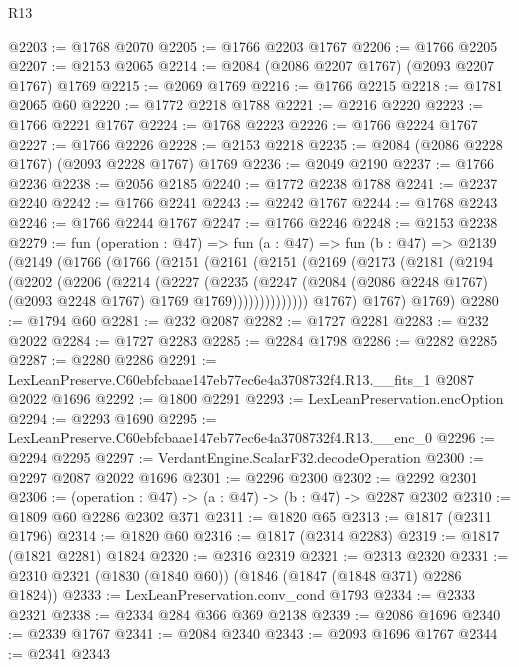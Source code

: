 \begin{lexlean}{R13}
\begin{coremodule}
@2203 := @1768 @2070
@2205 := @1766 @2203 @1767
@2206 := @1766 @2205
@2207 := @2153 @2065
@2214 := @2084 (@2086 @2207 @1767) (@2093 @2207 @1767) @1769
@2215 := @2069 @1769
@2216 := @1766 @2215
@2218 := @1781 @2065 @60
@2220 := @1772 @2218 @1788
@2221 := @2216 @2220
@2223 := @1766 @2221 @1767
@2224 := @1768 @2223
@2226 := @1766 @2224 @1767
@2227 := @1766 @2226
@2228 := @2153 @2218
@2235 := @2084 (@2086 @2228 @1767) (@2093 @2228 @1767) @1769
@2236 := @2049 @2190
@2237 := @1766 @2236
@2238 := @2056 @2185
@2240 := @1772 @2238 @1788
@2241 := @2237 @2240
@2242 := @1766 @2241
@2243 := @2242 @1767
@2244 := @1768 @2243
@2246 := @1766 @2244 @1767
@2247 := @1766 @2246
@2248 := @2153 @2238
@2279 := fun (operation : @47) =>
  fun (a : @47) =>
  fun (b : @47) =>
  @2139
    (@2149
      (@1766
        (@1766
          (@2151
            (@2161
              (@2151
                (@2169
                  (@2173
                    (@2181
                      (@2194
                        (@2202
                          (@2206
                            (@2214
                              (@2227
                                (@2235
                                  (@2247
                                    (@2084
                                      (@2086 @2248 @1767)
                                      (@2093 @2248 @1767)
                                      @1769
                                      @1769))))))))))))))
          @1767)
        @1767)
      @1769)
@2280 := @1794 @60
@2281 := @232 @2087
@2282 := @1727 @2281
@2283 := @232 @2022
@2284 := @1727 @2283
@2285 := @2284 @1798
@2286 := @2282 @2285
@2287 := @2280 @2286
@2291 := LexLeanPreserve.C60ebfcbaae147eb77ec6e4a3708732f4.R13.__fits_1 @2087 @2022 @1696
@2292 := @1800 @2291
@2293 := LexLeanPreservation.encOption
@2294 := @2293 @1690
@2295 := LexLeanPreserve.C60ebfcbaae147eb77ec6e4a3708732f4.R13.__enc_0
@2296 := @2294 @2295
@2297 := VerdantEngine.ScalarF32.decodeOperation
@2300 := @2297 @2087 @2022 @1696
@2301 := @2296 @2300
@2302 := @2292 @2301
@2306 := (operation : @47) -> (a : @47) -> (b : @47) -> @2287 @2302
@2310 := @1809 @60 @2286 @2302 @371
@2311 := @1820 @65
@2313 := @1817 (@2311 @1796)
@2314 := @1820 @60
@2316 := @1817 (@2314 @2283)
@2319 := @1817 (@1821 @2281) @1824
@2320 := @2316 @2319
@2321 := @2313 @2320
@2331 := @2310 @2321 (@1830 (@1840 @60)) (@1846 (@1847 (@1848 @371) @2286 @1824))
@2333 := LexLeanPreservation.conv_cond @1793
@2334 := @2333 @2321
@2338 := @2334 @284 @366 @369 @2138
@2339 := @2086 @1696
@2340 := @2339 @1767
@2341 := @2084 @2340
@2343 := @2093 @1696 @1767
@2344 := @2341 @2343

\end{coremodule}
\end{lexlean}
